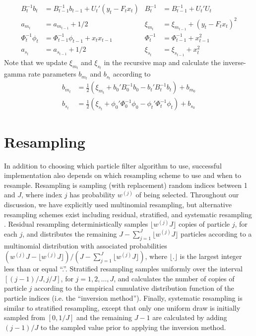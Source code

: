 \begin{align}
B_t^{-1}b_t &= B_{t-1}^{-1}b_{t-1} + U_t'(y_t - F_tx_t) & B_t^{-1} &= B_{t-1}^{-1} + U_t'U_t \label{eqn:pl:dr:suff} \\
a_{m_t} &= a_{m_{t-1}} + 1/2 & \xi_{m_t} &= \xi_{m_{t-1}} + (y_t - F_tx_t)^2 \nonumber \\
\Phi_t^{-1}\phi_t &= \Phi_{t-1}^{-1}\phi_{t-1} + x_tx_{t-1} & \Phi_t^{-1} &= \Phi_{t-1}^{-1} + x_{t-1}^2 \nonumber \\
a_{s_t} &= a_{s_{t-1}} + 1/2 & \xi_{s_t} &= \xi_{s_{t-1}} + x_t^2 \nonumber 
\end{align}
Note that we update $\xi_{m_t}$ and $\xi_{s_t}$ in the recursive map and calculate the inverse-gamma rate parameters $b_{m_t}$ and $b_{s_t}$ according to
\begin{align}
b_{m_t} &= \frac{1}{2}\left(\xi_{m_t} + b_0'B_0^{-1}b_0 - b_t'B_t^{-1}b_t\right) + b_{m_0} \label{eqn:pl:dr:rate} \\
b_{s_t} &= \frac{1}{2}\left(\xi_{s_t} + \phi_0'\Phi_0^{-1}\phi_0 - \phi_t'\Phi_t^{-1}\phi_t\right) + b_{s_0} \nonumber
\end{align}

\section{Resampling \label{sec:resample}}

In addition to choosing which particle filter algorithm to use, successful implementation also depends on which resampling scheme to use and when to resample. Resampling is sampling (with replacement) random indices between 1 and $J$, where index $j$ has probability $w^{(j)}$ of being selected. Throughout our discussion, we have explicitly used multinomial resampling, but alternative resampling schemes exist including residual, stratified, and systematic resampling \citep{Douc:Capp:Moul:comp:2005}. Residual resampling deterministically samples $\lfloor w^{(j)} J \rfloor$ copies of particle $j$, for each $j$, and distributes the remaining $J - \sum^J_{j=1} \lfloor w^{(j)} J \rfloor$  particles according to a multinomial distribution with associated probabilities $(w^{(j)} J - \lfloor w^{(j)} J \rfloor) / (J - \sum^J_{j=1} \lfloor w^{(j)} J \rfloor)$, where $\lfloor . \rfloor$ is the largest integer less than or equal ``.''. Stratified resampling samples uniformly over the interval $[(j-1) / J, j / J]$, for $j = 1, 2, \ldots, J$, and calculates the number of copies of particle $j$ according to the empirical cumulative distribution function of the particle indices (i.e. the ``inversion method''). Finally, systematic resampling is similar to stratified resampling, except that only one uniform draw is initially sampled from $[0, 1/J]$ and the remaining $J-1$ are calculated by adding $(j-1) / J$ to the sampled value prior to applying the inversion method.

